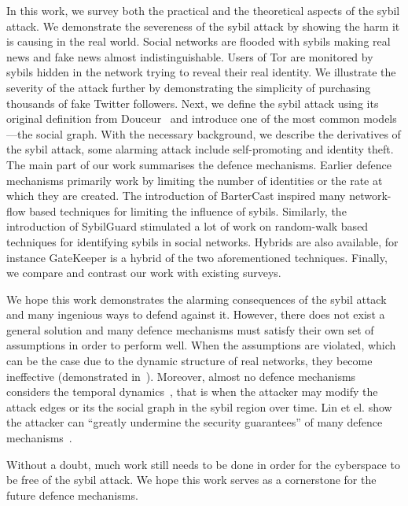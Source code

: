 In this work, we survey both the practical and the theoretical aspects of the
sybil attack. We demonstrate the severeness of the sybil attack by showing the
harm it is causing in the real world. Social networks are flooded with sybils
making real news and fake news almost indistinguishable. Users of Tor are
monitored by sybils hidden in the network trying to reveal their real identity.
We illustrate the severity of the attack further by demonstrating the simplicity
of purchasing thousands of fake Twitter followers. Next, we define the sybil
attack using its original definition from Douceur~\cite{douceur2002sybil} and
introduce one of the most common models---the social graph. With the necessary
background, we describe the derivatives of the sybil attack, some alarming
attack include self-promoting and identity theft. The main part of our work
summarises the defence mechanisms. Earlier defence mechanisms primarily work by
limiting the number of identities or the rate at which they are created. The
introduction of BarterCast inspired many network-flow based techniques for
limiting the influence of sybils. Similarly, the introduction of SybilGuard
stimulated a lot of work on random-walk based techniques for identifying sybils
in social networks. Hybrids are also available, for instance GateKeeper is a
hybrid of the two aforementioned techniques. Finally, we compare and contrast
our work with existing surveys.

We hope this work demonstrates the alarming consequences of the sybil attack and
many ingenious ways to defend against it. However, there does not exist a
general solution and many defence mechanisms must satisfy their own set of
assumptions in order to perform well. When the assumptions are violated, which
can be the case due to the dynamic structure of real networks, they become
ineffective (demonstrated in~\cite{liu2016smartwalk}). Moreover, almost no
defence mechanisms considers the temporal dynamics~\cite{liu2015exploiting},
that is when the attacker may modify the attack edges or its the social graph in
the sybil region over time. Lin et el. show the attacker can ``greatly undermine
the security guarantees'' of many defence mechanisms~\cite{liu2015exploiting}.

Without a doubt, much work still needs to be done in order for the cyberspace to
be free of the sybil attack. We hope this work serves as a cornerstone for the
future defence mechanisms.

